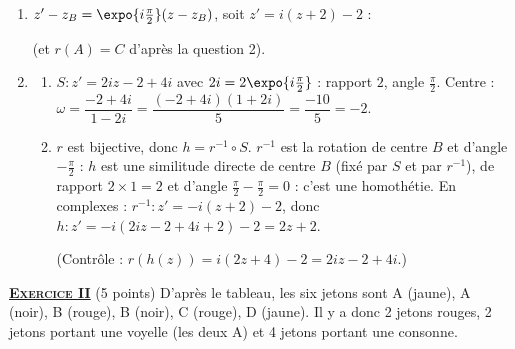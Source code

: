 \begin{enumerate}
   \item {}
      $z' - z_B = \expo{i\frac{\pi}{2}}(z - z_B)$, soit $z' = i(z + 2) - 2$ :
      \par\noindent{} (et $r(A) = C$ d'apr\`es la question 2).
   \item
      \begin{enumerate}
         \item {}
            $S : z' = 2iz - 2 + 4i$ avec $2i = 2\expo{i\frac{\pi}{2}}$ : rapport $2$, angle $\frac{\pi}{2}$.
            Centre : $\omega = \dfrac{-2 + 4i}{1 - 2i} = \dfrac{(-2 + 4i)(1 + 2i)}{5} = \dfrac{-10}{5} = -2$.
            \par\noindent{}
         \item {}
            $r$ est bijective, donc $h = r^{-1} \circ S$. $r^{-1}$ est la rotation de centre $B$ et d'angle $-\frac{\pi}{2}$ :
            $h$ est une similitude directe de centre $B$ (fix\'e par $S$ et par $r^{-1}$), de rapport $2 \times 1 = 2$ et
            d'angle $\frac{\pi}{2} - \frac{\pi}{2} = 0$ : c'est une homoth\'etie.
            En complexes : $r^{-1} : z' = -i(z + 2) - 2$, donc $h : z' = -i(2iz - 2 + 4i + 2) - 2 = 2z + 2$.
            \par\noindent{}
            (Contr\^ole : $r(h(z)) = i(2z + 4) - 2 = 2iz - 2 + 4i$.)
      \end{enumerate}
\end{enumerate}
\noindent \underline{\textsc{\textbf{Exercice II}}} (5 points) \newline
D'apr\`es le tableau, les six jetons sont
A (jaune), A (noir), B (rouge), B (noir), C (rouge), D (jaune).
Il y a donc 2 jetons rouges, 2 jetons portant une voyelle (les deux A) et 4 jetons portant une consonne.

